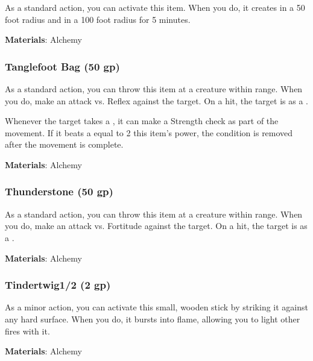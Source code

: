 As a standard action, you can activate this item.
When you do, it creates  in a 50 foot radius and  in a 100 foot radius for 5 minutes.



\vspace{0.25em}
\textbf{Materials}: Alchemy


\lowercase{\hypertarget{item:Tanglefoot Bag}{}}\label{item:Tanglefoot Bag}
\hypertarget{item:Tanglefoot Bag}{\subsubsection{Tanglefoot Bag\hfill{} (50 gp)}}

As a standard action, you can throw this item at a creature within \rngclose range.
When you do, make an attack vs. Reflex against the target.
On a hit, the target is  as a .

Whenever the target takes a , it can make a Strength check as part of the movement.
If it beats a  equal to 2 \add this item's power, the condition is removed after the movement is complete.



\vspace{0.25em}
\textbf{Materials}: Alchemy


\lowercase{\hypertarget{item:Thunderstone}{}}\label{item:Thunderstone}
\hypertarget{item:Thunderstone}{\subsubsection{Thunderstone\hfill{} (50 gp)}}

As a standard action, you can throw this item at a creature within \rngclose range.
When you do, make an attack vs. Fortitude against the target.
On a hit, the target is  as a .



\vspace{0.25em}
\textbf{Materials}: Alchemy


\lowercase{\hypertarget{item:Tindertwig}{}}\label{item:Tindertwig}
\hypertarget{item:Tindertwig}{\subsubsection{Tindertwig\hfill1/2 (2 gp)}}

As a minor action, you can activate this small, wooden stick by striking it against any hard surface.
When you do, it bursts into flame, allowing you to light other fires with it.



\vspace{0.25em}
\textbf{Materials}: Alchemy
